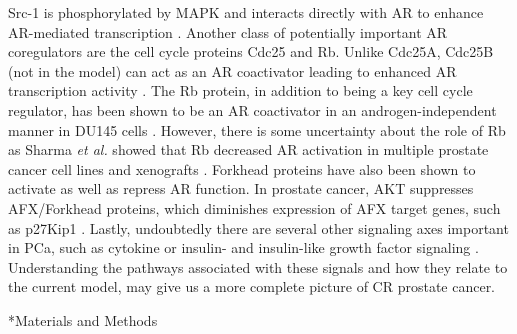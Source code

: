 \documentclass[12pt]{article}
\makeatletter
\renewcommand\section{\@startsection
	{subsection}{2}{0mm}
	{-0.2in}
	{0.05\baselineskip}
	{\normalfont\large\bfseries}}
\makeatother
\begin{document}
Src-1 is phosphorylated by MAPK and interacts directly with AR to enhance AR-mediated transcription \cite{Heemers2007}. 
Another class of potentially important AR coregulators are the cell cycle proteins Cdc25 and Rb.
Unlike Cdc25A, Cdc25B (not in the model) can act as an AR coactivator leading to enhanced AR transcription activity \cite{Ngan2003}. 
The Rb protein, in addition to being a key cell cycle regulator, has been shown to be an AR coactivator in an androgen-independent manner in DU145 cells \cite{Yeh1998}.
However, there is some uncertainty about the role of Rb as Sharma \textit{et al.} showed that Rb decreased AR activation in multiple prostate cancer cell lines and xenografts \cite{Sharma2010}. 
Forkhead proteins have also been shown to activate as well as repress AR function. 
In prostate cancer, AKT suppresses AFX/Forkhead proteins, which diminishes expression of AFX target genes, such as p27Kip1 \cite{Graff2000, Brunet1999, Medema2000, Takaishi1999}. 
Lastly, undoubtedly there are several other signaling axes important in PCa, such as cytokine or insulin- and insulin-like growth factor signaling \citep{Cardillo2003,Heinlein2004,Tam2007,Seaton2008}.
Understanding the pathways associated with these signals and how they relate to the current model, may give us a more complete picture of CR prostate cancer. 

                
\clearpage

\section*{Materials and Methods}
\end{document}
